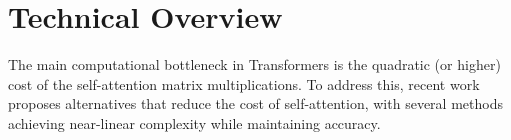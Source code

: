 \documentclass[sigconf,anonymous,review,balance=false]{acmart}
\begin{document}
\section{Technical Overview}
\label{sec:overview}

The main computational bottleneck in Transformers is the quadratic (or higher) cost of the self-attention matrix multiplications. To address this, recent work~\cite{Linformer, Longformer, Nystromformer, Performer, A3} proposes alternatives that reduce the cost of self-attention, with several methods achieving near-linear complexity while maintaining accuracy.
\end{document}
